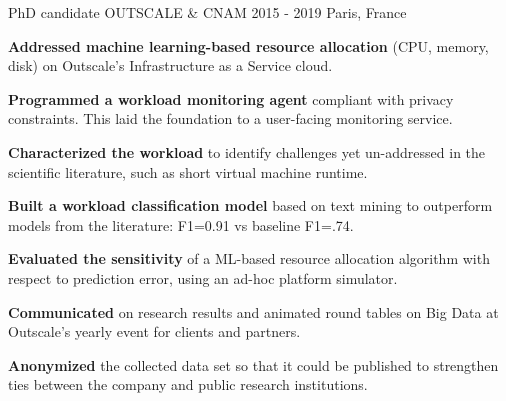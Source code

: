 \begin{cventries}
\vspace{2mm}
  \cventry
  {PhD candidate} 
  {OUTSCALE \& CNAM}
  {2015 - 2019} %
  {Paris, France} %
    {
      \begin{cvitems} %
      \item {\textbf{Addressed machine learning-based resource allocation} (CPU, memory, disk) on Outscale's Infrastructure as a Service cloud.}
      \item{\textbf{Programmed a workload monitoring agent} compliant with privacy constraints. This laid the foundation to a user-facing monitoring service.}
      \item{\textbf{Characterized the workload} to identify challenges yet un-addressed in the scientific literature, such as short virtual machine runtime.}
      \item{\textbf{Built a workload classification model} based on text mining to outperform models from the literature: F1=0.91 vs baseline F1=.74.} 
      \item{\textbf{Evaluated the sensitivity} of a ML-based resource allocation algorithm with respect to prediction error, using an ad-hoc platform simulator.}
      \item{\textbf{Communicated} on research results and animated round tables on Big Data at Outscale's yearly event for clients and partners.}
      \item{\textbf{Anonymized} the collected data set so that it could be published to strengthen ties between the company and public research institutions.}
      \end{cvitems}
    }




\end{cventries}
